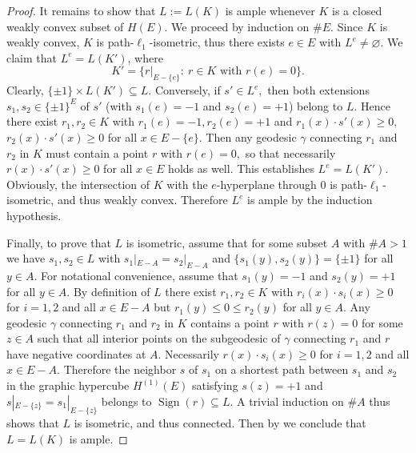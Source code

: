 \documentclass[11pt,a4paper]{amsart}
\theoremstyle{definition}
\numberwithin{equation}{section}
\DeclareMathOperator{\Sign}{Sign}
\newcommand{\covectors}{\ensuremath{L}}
\newcommand{\HH}{\ensuremath{H}}
\begin{document}
\begin{proof} %
It remains to show that $\covectors:=L(K)$ is ample whenever $K$ is a closed weakly convex subset of $\HH(E).$ We proceed by induction on $\#E.$ Since $K$ is weakly convex, $K$ is path-$\ell_1$-isometric, thus there exists $e\in E$ with $\covectors^e\ne\varnothing$.  We claim that $\covectors^e=L(K')$, where
$$K'=\{ r|_{E-\{ e\}}: ~r\in K \mbox{ with } r(e)=0\}.$$
Clearly, $\{ \pm 1\}\times L(K')\subseteq \covectors$. Conversely, if $s'\in \covectors^e,$ then both extensions $s_1,s_2\in \{ \pm 1\}^E$ of $s'$ (with $s_1(e)=-1$ and
$s_2(e)=+1$) belong to $\covectors$. Hence there exist $r_1,r_2\in K$ with $r_1(e)=-1, r_2(e)=+1$ and $r_1(x)\cdot s'(x)\ge 0,$ $r_2(x)\cdot s'(x)\ge 0$ for all $x\in E-\{ e\}.$
Then any geodesic $\gamma$ connecting $r_1$ and $r_2$ in $K$ must contain a point $r$ with $r(e)=0,$ so that necessarily $r(x)\cdot s'(x)\ge 0$ for all $x\in E$ holds as well. This establishes $\covectors^e=L(K').$ Obviously,  the intersection of $K$ with the $e$-hyperplane through $0$ is path-$\ell_1$-isometric, and thus weakly convex.  Therefore $\covectors^e$
is ample by the induction hypothesis.

Finally, to prove that $\covectors$ is isometric, assume that for some subset $A$ with $\#A>1$ we have $s_1,s_2\in \covectors$ with $s_1|_{E-A}=s_2|_{E-A}$ and $\{ s_1(y),s_2(y)\}=\{\pm 1\}$
for all $y\in A.$ For notational convenience,  assume that $s_1(y)=-1$ and $s_2(y)=+1$ for all $y\in A.$ By definition of $\covectors$ there exist $r_1,r_2\in K$ with
$r_i(x)\cdot s_i(x)\ge 0$ for $i=1,2$ and all $x\in E-A$ but $r_1(y)\le 0\le r_2(y)$ for all $y\in A.$ Any geodesic $\gamma$ connecting $r_1$ and $r_2$ in $K$ contains
a point $r$ with $r(z)=0$ for some $z\in A$ such that all interior points on the subgeodesic of $\gamma$ connecting $r_1$ and $r$ have negative coordinates at $A.$
Necessarily $r(x)\cdot s_i(x)\ge 0$ for $i=1,2$ and all $x\in E-A.$ Therefore the neighbor $s$ of $s_1$ on a shortest path between $s_1$ and $s_2$ in the graphic
hypercube ${\HH}^{(1)}(E)$ satisfying $s(z)=+1$ and $s|_{E-\{ z\}}=s_1|_{E-\{ z\}}$ belongs to $\Sign(r)\subseteq \covectors.$ A trivial induction on $\#A$ thus shows
that $\covectors$ is isometric, and thus connected. Then by \cite[Theorem 4]{BaChDrKo} we conclude that $\covectors=L(K)$ is ample.
\end{proof}
\end{document}
